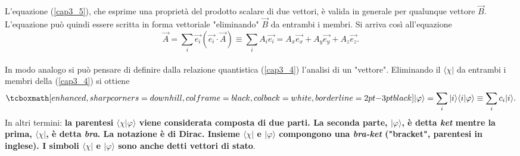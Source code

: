 L'equazione (\ref{cap3_5}), che esprime una proprietà del prodotto scalare di due vettori, è valida in generale per qualunque vettore $\vec{B}$. L'equazione può quindi essere scritta in forma vettoriale "eliminando" $\vec{B}$ da entrambi i membri. Si arriva così all'equazione 
	\begin{equation}
		\vec{A} = \sum \limits_{i} \vec{e_i} (\vec{e_i}\cdot\vec{A}) \equiv \sum \limits_{i} A_i\vec{e_i}= A_x\vec{e_x}+A_y\vec{e_y}+A_z\vec{e_z} .
	\end{equation}\\
	
In modo analogo si può pensare di definire dalla relazione quantistica (\ref{cap3_4}) l'analisi di un "vettore". Eliminando il $\langle \chi |$ da entrambi i membri della (\ref{cap3_4}) si ottiene
	\begin{equation}
		\tcboxmath[enhanced, sharp corners=downhill, colframe=black, colback=white, borderline={2pt}{-3pt}{black}]{
 			| \varphi \rangle= \sum \limits_{i} | i \rangle \langle i | \varphi \rangle \equiv \sum \limits_{i} c_i | i \rangle .
 			}
	\label{cap3_8}
	\end{equation}
In altri termini: \textbf{la parentesi $\langle \chi | \varphi \rangle $ viene considerata composta di due parti. La seconda parte, $| \varphi \rangle $, è detta \emph{ket} mentre la prima, $\langle \chi |$, è detta \emph{bra}. La notazione è di Dirac. Insieme $\langle \chi |$ e $| \varphi \rangle$ compongono una \emph{bra-ket} ("bracket", parentesi in inglese). I simboli $\langle \chi |$ e $| \varphi \rangle$ sono anche detti vettori di stato}.\\

